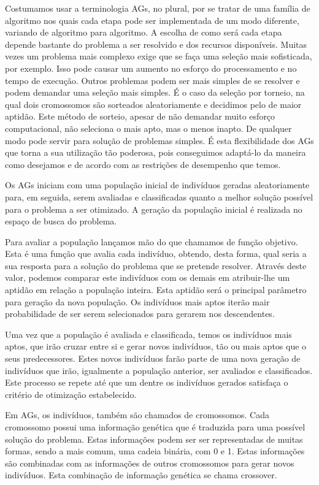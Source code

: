 \documentclass[
    12pt,               %
    twoside,            %
    a4paper,            %
    english,            %
    french,             %
    spanish,            %
    brazil,             %
    ]{abntex2}
\begin{document}
  Costumamos usar a terminologia AGs, no plural, por se tratar de uma família de algoritmo nos quais cada etapa pode ser implementada de um modo diferente, variando de algoritmo para algoritmo. A escolha de como será cada etapa depende bastante do problema a ser resolvido e dos recursos disponíveis. Muitas vezes um problema mais complexo exige que se faça uma seleção mais sofisticada, por exemplo. Isso pode causar um aumento no esforço do processamento e no tempo de execução. Outros problemas podem ser mais simples de se resolver e podem demandar uma seleção mais simples. É o caso da seleção por torneio, na qual dois cromossomos são sorteados aleatoriamente e decidimos pelo de maior aptidão. Este método de sorteio, apesar de não demandar muito esforço computacional, não seleciona o mais apto, mas o menos inapto. De qualquer modo pode servir para solução de problemas simples. É esta flexibilidade dos AGs que torna a sua utilização tão poderosa, pois conseguimos adaptá-lo da maneira como desejamos e de acordo com as restrições de desempenho que temos.

  Os AGs iniciam com uma população inicial de indivíduos geradas aleatoriamente para, em seguida, serem avaliadas e classificadas quanto a melhor solução possível para o problema a ser otimizado.  A geração da população inicial é realizada no espaço de busca do problema.

  Para avaliar a população lançamos mão do que chamamos de função objetivo. Esta é uma função que avalia cada indivíduo, obtendo, desta forma, qual seria a sua resposta para a solução do problema que se pretende resolver.  Através deste valor, podemos comparar este indivíduos com os demais em atribuir-lhe um aptidão em relação a população inteira. Esta aptidão será o principal parâmetro para geração da nova população. Os indivíduos mais aptos iterão mair probabilidade de ser serem selecionados para gerarem nos descendentes.

  Uma vez que a população é avaliada e classificada, temos os indivíduos mais aptos, que irão cruzar entre si e gerar novos indivíduos, tão ou mais aptos que o seus predecessores. Estes novos indivíduos farão parte de uma nova geração de indivíduos que irão, igualmente a população anterior, ser avaliados e classificados. Este processo se repete até que um dentre os indivíduos gerados satisfaça o critério de otimização estabelecido.

  Em AGs, os indivíduos, também são chamados de cromossomos. Cada cromossomo possui uma informação genética que é traduzida para uma possível solução do problema. Estas informações podem ser ser representadas de muitas formas, sendo a mais comum, uma cadeia binária, com 0 e 1. Estas informações são combinadas com as informações de outros cromossomos para gerar novos indivíduos. Esta combinação de informação genética se chama crossover.
\end{document}
